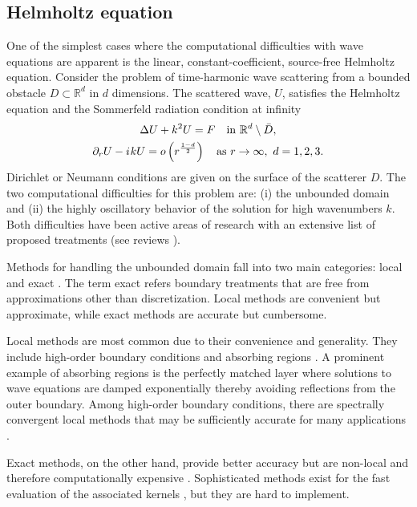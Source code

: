 \documentclass[draft,onefignum,onetabnum]{siamart190516}
\newcommand{\iu}{{i\mkern1mu}}
\begin{document}
\subsection{Helmholtz equation}
One of the simplest cases where the computational difficulties with wave equations are apparent is the linear, constant-coefficient, source-free Helmholtz equation. Consider the problem of time-harmonic wave scattering from a bounded obstacle $D \subset \mathbb{R}^d$ in $d$ dimensions. The scattered wave, $U$, satisfies the Helmholtz equation and the Sommerfeld radiation condition at infinity
\begin{equation}
	\label{eq:helm}
	\begin{gathered}
		\Delta U + k^2 U = F \quad \mathrm{in } \ \mathbb{R}^d\setminus \bar{D}, \\
		\partial_r U - \iu k U = o\left(r^{\frac{1-d}{2}}\right) \quad \mathrm{as} \ r\to\infty,\ d=1,2,3.
	\end{gathered}
\end{equation}
Dirichlet or Neumann conditions are given on the surface of the scatterer $D$. The two computational difficulties for this problem are: (i) the unbounded domain and (ii) the highly oscillatory behavior of the solution for high wavenumbers $k$. Both difficulties have been active areas of research with an extensive list of proposed treatments (see reviews \cite{TSYNKOV1998465, HagstromReview, engquist2003computational}).

Methods for handling the unbounded domain fall into two main categories: local and exact \cite{TSYNKOV1998465, HagstromReview, givoli2013numerical}. The term exact refers boundary treatments that are free from approximations other than discretization. Local methods are convenient but approximate, while exact methods are accurate but cumbersome. 

Local methods are most common due to their convenience and generality. They include high-order boundary conditions \cite{EngquistMajda77, BaylissTurkel80} and absorbing regions \cite{israeli1981approximation, BERENGER1994185}. A prominent example of absorbing regions is the perfectly matched layer \cite{BERENGER1994185} where solutions to wave equations are damped exponentially thereby avoiding reflections from the outer boundary. Among high-order boundary conditions, there are spectrally convergent local methods that may be sufficiently accurate for many applications \cite{hagstrom2009complete}. 

Exact methods, on the other hand, provide better accuracy but are non-local and therefore computationally expensive \cite{keller1989exact, GROTE1998327, grote1996nonreflecting}. Sophisticated methods exist for the fast evaluation of the associated kernels \cite{alpert2000rapid}, but they are hard to implement. 
\end{document}
